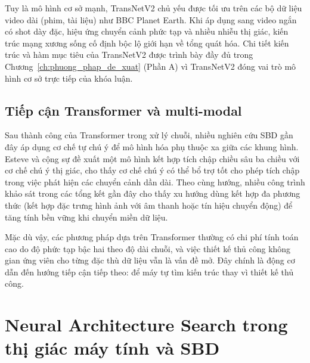 Tuy là mô hình cơ sở mạnh, TransNetV2 chủ yếu được tối ưu trên các bộ dữ liệu video dài (phim, tài liệu) như BBC Planet Earth. Khi áp dụng sang video ngắn có shot dày đặc, hiệu ứng chuyển cảnh phức tạp và nhiều nhiễu thị giác, kiến trúc mạng xương sống cố định bộc lộ giới hạn về tổng quát hóa. Chi tiết kiến trúc và hàm mục tiêu của TransNetV2 được trình bày đầy đủ trong Chương~\ref{ch:phuong_phap_de_xuat} (Phần A) vì TransNetV2 đóng vai trò mô hình cơ sở trực tiếp của khóa luận.

\subsection{Tiếp cận Transformer và multi-modal}
Sau thành công của Transformer \cite{vaswani2017attention} trong xử lý chuỗi, nhiều nghiên cứu SBD gần đây áp dụng cơ chế tự chú ý để mô hình hóa phụ thuộc xa giữa các khung hình. Esteve và cộng sự \cite{esteve2023shot} đề xuất một mô hình kết hợp tích chập chiều sâu ba chiều với cơ chế chú ý thị giác, cho thấy cơ chế chú ý có thể bổ trợ tốt cho phép tích chập trong việc phát hiện các chuyển cảnh dần dài. Theo cùng hướng, nhiều công trình khảo sát trong các tổng kết gần đây \cite{Kar2024_VideoSBD_IssuesChallengesSolutions} cho thấy xu hướng dùng kết hợp đa phương thức (kết hợp đặc trưng hình ảnh với âm thanh hoặc tín hiệu chuyển động) để tăng tính bền vững khi chuyển miền dữ liệu.

Mặc dù vậy, các phương pháp dựa trên Transformer thường có chi phí tính toán cao do độ phức tạp bậc hai theo độ dài chuỗi, và việc thiết kế thủ công không gian ứng viên cho từng đặc thù dữ liệu vẫn là vấn đề mở. Đây chính là động cơ dẫn đến hướng tiếp cận tiếp theo: để máy tự tìm kiến trúc thay vì thiết kế thủ công.

\section{Neural Architecture Search trong thị giác máy tính và SBD}
\label{sec:nas_for_sbd}

